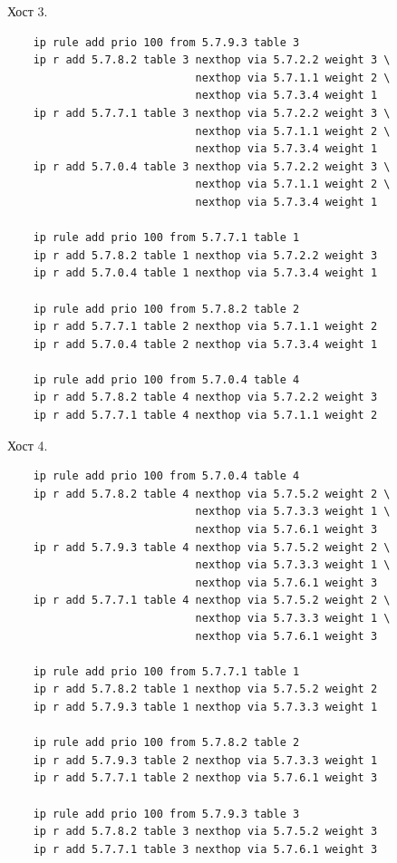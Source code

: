 \documentclass[11pt, a4paper] {ncc}
\begin{document}
		Хост 3.
            \begin{verbatim}
    ip rule add prio 100 from 5.7.9.3 table 3
    ip r add 5.7.8.2 table 3 nexthop via 5.7.2.2 weight 3 \
                             nexthop via 5.7.1.1 weight 2 \
                             nexthop via 5.7.3.4 weight 1
    ip r add 5.7.7.1 table 3 nexthop via 5.7.2.2 weight 3 \
                             nexthop via 5.7.1.1 weight 2 \
                             nexthop via 5.7.3.4 weight 1
    ip r add 5.7.0.4 table 3 nexthop via 5.7.2.2 weight 3 \
                             nexthop via 5.7.1.1 weight 2 \
                             nexthop via 5.7.3.4 weight 1
   
    ip rule add prio 100 from 5.7.7.1 table 1
    ip r add 5.7.8.2 table 1 nexthop via 5.7.2.2 weight 3
    ip r add 5.7.0.4 table 1 nexthop via 5.7.3.4 weight 1

    ip rule add prio 100 from 5.7.8.2 table 2
    ip r add 5.7.7.1 table 2 nexthop via 5.7.1.1 weight 2
    ip r add 5.7.0.4 table 2 nexthop via 5.7.3.4 weight 1

    ip rule add prio 100 from 5.7.0.4 table 4
    ip r add 5.7.8.2 table 4 nexthop via 5.7.2.2 weight 3
    ip r add 5.7.7.1 table 4 nexthop via 5.7.1.1 weight 2
            \end{verbatim}
		Хост 4.
            \begin{verbatim}
    ip rule add prio 100 from 5.7.0.4 table 4
    ip r add 5.7.8.2 table 4 nexthop via 5.7.5.2 weight 2 \
                             nexthop via 5.7.3.3 weight 1 \
                             nexthop via 5.7.6.1 weight 3
    ip r add 5.7.9.3 table 4 nexthop via 5.7.5.2 weight 2 \
                             nexthop via 5.7.3.3 weight 1 \
                             nexthop via 5.7.6.1 weight 3
    ip r add 5.7.7.1 table 4 nexthop via 5.7.5.2 weight 2 \
                             nexthop via 5.7.3.3 weight 1 \
                             nexthop via 5.7.6.1 weight 3

    ip rule add prio 100 from 5.7.7.1 table 1
    ip r add 5.7.8.2 table 1 nexthop via 5.7.5.2 weight 2
    ip r add 5.7.9.3 table 1 nexthop via 5.7.3.3 weight 1

    ip rule add prio 100 from 5.7.8.2 table 2
    ip r add 5.7.9.3 table 2 nexthop via 5.7.3.3 weight 1
    ip r add 5.7.7.1 table 2 nexthop via 5.7.6.1 weight 3

    ip rule add prio 100 from 5.7.9.3 table 3
    ip r add 5.7.8.2 table 3 nexthop via 5.7.5.2 weight 3
    ip r add 5.7.7.1 table 3 nexthop via 5.7.6.1 weight 3
            \end{verbatim}
\end{document}
